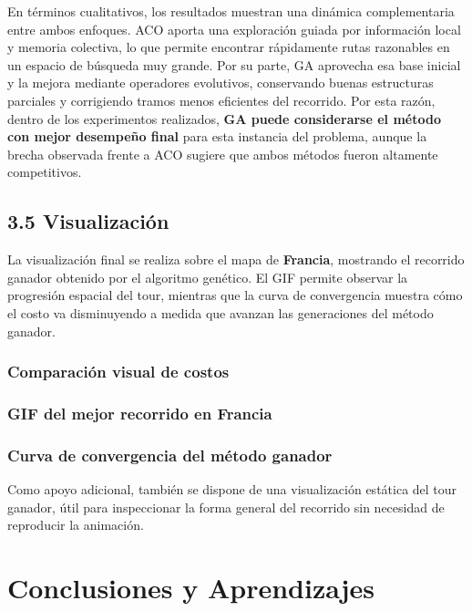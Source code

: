 \documentclass[
  12pt,
  letterpaper,
  DIV=11,
  numbers=noendperiod]{scrartcl}
\begin{document}
En términos cualitativos, los resultados muestran una dinámica
complementaria entre ambos enfoques. ACO aporta una exploración guiada
por información local y memoria colectiva, lo que permite encontrar
rápidamente rutas razonables en un espacio de búsqueda muy grande. Por
su parte, GA aprovecha esa base inicial y la mejora mediante operadores
evolutivos, conservando buenas estructuras parciales y corrigiendo
tramos menos eficientes del recorrido. Por esta razón, dentro de los
experimentos realizados, \textbf{GA puede considerarse el método con
mejor desempeño final} para esta instancia del problema, aunque la
brecha observada frente a ACO sugiere que ambos métodos fueron altamente
competitivos.

\subsection{3.5 Visualización}\label{visualizaciuxf3n}

La visualización final se realiza sobre el mapa de \textbf{Francia},
mostrando el recorrido ganador obtenido por el algoritmo genético. El
GIF permite observar la progresión espacial del tour, mientras que la
curva de convergencia muestra cómo el costo va disminuyendo a medida que
avanzan las generaciones del método ganador.

\subsubsection{Comparación visual de
costos}\label{comparaciuxf3n-visual-de-costos}

\subsubsection{GIF del mejor recorrido en
Francia}\label{gif-del-mejor-recorrido-en-francia}

\subsubsection{Curva de convergencia del método
ganador}\label{curva-de-convergencia-del-muxe9todo-ganador}

Como apoyo adicional, también se dispone de una visualización estática
del tour ganador, útil para inspeccionar la forma general del recorrido
sin necesidad de reproducir la animación.

\section{Conclusiones y Aprendizajes}\label{conclusiones-y-aprendizajes}
\end{document}

